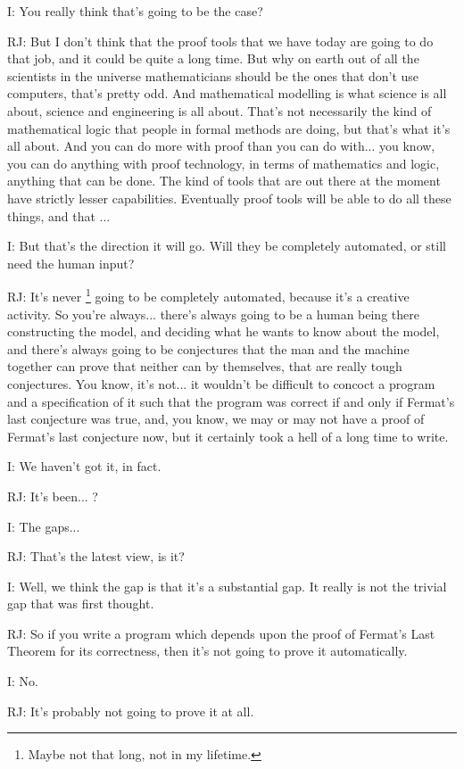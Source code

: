 \documentclass[10pt,titlepage]{book}
\begin{document}
I: You really think that's going to be the case?

RJ: But I don't think that the proof tools that we have today are going to do that job, and it could be quite a long time.
But why on earth out of all the scientists in the universe mathematicians should be the ones that don't use computers, that's pretty odd.
And mathematical modelling is what science is all about, science and engineering is all about.
That's not necessarily the kind of mathematical logic that people in formal methods are doing, but that's what it's all about.
And you can do more with proof than you can do with... you know, you can do anything with proof technology, in terms of mathematics and logic, anything that can be done.
The kind of tools that are out there at the moment have strictly lesser capabilities.
Eventually proof tools will be able to do all these things, and that ...

I: But that's the direction it will go.
Will they be completely automated, or still need the human input?

RJ: It's never%
\footnote{Maybe not that long, not in my lifetime.
}%
 going to be completely automated, because it's a creative activity.
So you're always... there's always going to be a human being there constructing the model, and deciding what he wants to know about the model, and there's always going to be conjectures that the man and the machine together can prove that neither can by themselves, that are really tough conjectures.
You know,  it's not... it wouldn't be difficult to concoct a program and a specification of it such that the program was correct if and only if Fermat's last conjecture was true, and, you know, we may or may not have a proof of Fermat's last conjecture now, but it certainly took a hell of a long time to write.

I: We haven't got it, in fact.

RJ: It's been... ?

I: The gaps...

RJ: That's the latest view, is it?

I: Well, we think the gap is that it's a substantial gap.
It really is not the trivial gap that was first thought.

RJ: So if you write a program which depends upon the proof of Fermat's Last Theorem for its correctness, then it's not going to prove it automatically.

I: No.

RJ: It's probably not going to prove it at all.
\end{document}
